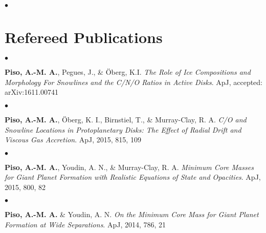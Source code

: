 \documentclass[margin,line]{res}
\newenvironment{list2}{
  \begin{list}{$\bullet$}{%
      \setlength{\itemsep}{0in}
      \setlength{\parsep}{0in} \setlength{\parskip}{0in}
      \setlength{\topsep}{0in} \setlength{\partopsep}{0in} 
      \setlength{\leftmargin}{0.2in}}}{\end{list}}
\begin{document}
\begin{resume}
\begin{list2}
\end{list2}

%
%

\section{\sc Refereed Publications}

\begin{list2}
\item[] {\bf Piso, A.-M. A.}, Pegues, J., \& \"Oberg, K.I. \textit{The Role of Ice Compositions and Morphology For Snowlines and the C/N/O Ratios in Active Disks}. ApJ, accepted: arXiv:1611.00741  \\
\end{list2}

\begin{list2}
\item[] {\bf Piso, A.-M. A.}, \"Oberg, K. I., Birnstiel, T., \& Murray-Clay, R. A. \textit{C/O and Snowline Locations in Protoplanetary Disks: The Effect of Radial Drift and Viscous Gas Accretion}. ApJ, 2015, 815, 109 \\
\end{list2}

\begin{list2}
\item[] {\bf Piso, A.-M. A.}, Youdin, A. N., \& Murray-Clay, R. A. \textit{Minimum Core Masses for Giant Planet Formation with Realistic Equations of State and Opacities}. ApJ, 2015, 800, 82 \\
\end{list2}

\begin{list2}
\item[] {\bf Piso, A.-M. A.} \& Youdin, A. N. \textit{On the Minimum Core Mass for Giant Planet Formation at Wide Separations}. ApJ, 2014, 786, 21 \\
\end{list2}




\end{resume}
\end{document}

